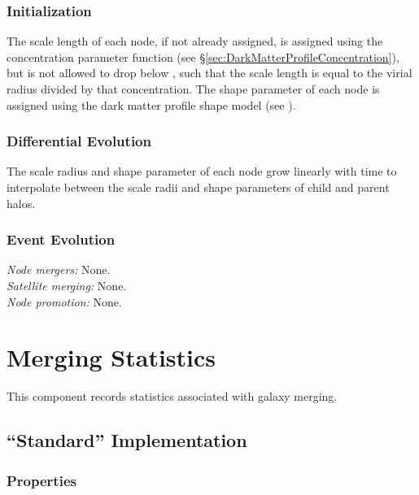 \subsubsection{Initialization}

The scale length of each node, if not already assigned, is assigned using the concentration parameter function (see \S\ref{sec:DarkMatterProfileConcentration}), but is not allowed to drop below {\normalfont \ttfamily [darkMatterProfileMinimumConcentration]}, such that the scale length is equal to the virial radius divided by that concentration. The shape parameter of each \gls{node} is assigned using the dark matter profile shape model (see ).

\subsubsection{Differential Evolution}

The scale radius and shape parameter of each node grow linearly with time to interpolate between the scale radii and shape parameters of child and parent halos.

\subsubsection{Event Evolution}

\noindent\emph{Node mergers:} None.\\

\noindent\emph{Satellite merging:} None.\\

\noindent\emph{Node promotion:} None.\\


\section{Merging Statistics}

This \gls{component} records statistics associated with galaxy merging.

\subsection{``Standard'' Implementation}

\subsubsection{Properties}

